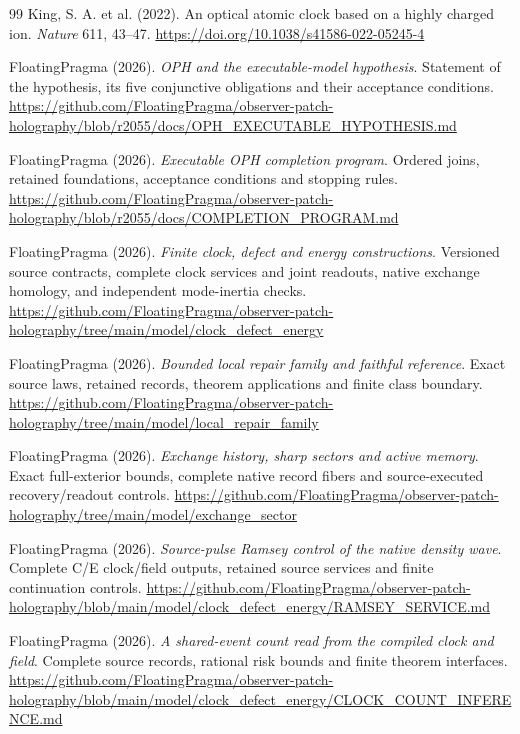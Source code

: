 \documentclass[11pt]{article}
\theoremstyle{definition}
\theoremstyle{remark}
\theoremstyle{plain}
\begin{document}
{\begin{thebibliography}{99}
King, S. A. et al. (2022). An optical atomic clock based on a highly
charged ion. \emph{Nature} 611, 43--47.
\url{https://doi.org/10.1038/s41586-022-05245-4}

FloatingPragma (2026). \emph{OPH and the executable-model hypothesis}.
Statement of the hypothesis, its five conjunctive obligations and their
acceptance conditions.
\url{https://github.com/FloatingPragma/observer-patch-holography/blob/r2055/docs/OPH_EXECUTABLE_HYPOTHESIS.md}

FloatingPragma (2026). \emph{Executable OPH completion program}. Ordered
joins, retained foundations, acceptance conditions and stopping rules.
\url{https://github.com/FloatingPragma/observer-patch-holography/blob/r2055/docs/COMPLETION_PROGRAM.md}

FloatingPragma (2026). \emph{Finite clock, defect and energy constructions}.
Versioned source contracts, complete clock services and joint readouts,
native exchange homology, and independent mode-inertia checks.
\url{https://github.com/FloatingPragma/observer-patch-holography/tree/main/model/clock_defect_energy}

FloatingPragma (2026). \emph{Bounded local repair family and faithful reference}.
Exact source laws, retained records, theorem applications and finite
class boundary.
\url{https://github.com/FloatingPragma/observer-patch-holography/tree/main/model/local_repair_family}

FloatingPragma (2026). \emph{Exchange history, sharp sectors and active memory}.
Exact full-exterior bounds, complete native record fibers and source-executed
recovery/readout controls.
\url{https://github.com/FloatingPragma/observer-patch-holography/tree/main/model/exchange_sector}

FloatingPragma (2026). \emph{Source-pulse Ramsey control of the native density wave}.
Complete C/E clock/field outputs, retained source services and finite
continuation controls.
\url{https://github.com/FloatingPragma/observer-patch-holography/blob/main/model/clock_defect_energy/RAMSEY_SERVICE.md}

FloatingPragma (2026). \emph{A shared-event count read from the compiled clock and field}.
Complete source records, rational risk bounds and finite theorem interfaces.
\url{https://github.com/FloatingPragma/observer-patch-holography/blob/main/model/clock_defect_energy/CLOCK_COUNT_INFERENCE.md}


\end{thebibliography}}
\end{document}
